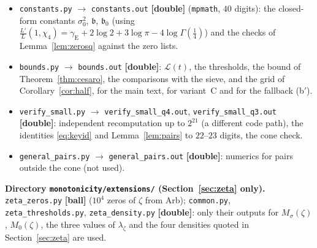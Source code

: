 \documentclass[11pt]{amsart}
\theoremstyle{definition}
\numberwithin{equation}{section}
\newcommand{\cL}{\mathcal L}          %
\newcommand{\vth}{\vartheta_{o}}      %
\begin{document}
\begin{itemize}
and $G\ge0.52$ on $[2^{13},10^{10}]$;
$(y-\vth(y))/\sqrt y\le1.98197$ resp.\ $1.99271$ for $y\ge1427$
against $c_1$; $\vth(y)-y\le-0.26\sqrt y$. The sign of
$\Theta_1(p)$ in this program is a floating-point decision and is
\emph{not} what the proof uses. What the proofs take from this
program is only Lemma~\ref{lem:theta}(a) on $(2^{22},10^{10}]$, and
not even that in variant~C.
\item \texttt{constants.py} $\to$ \texttt{constants.out}
\textbf{[double]} (\texttt{mpmath}, $40$ digits): the closed-form
constants $\sigma_0^2$, $\mathfrak b$, $\mathfrak b_0$ (using
$\frac{L'}{L}(1,\chi_4)=\gamma_{\mathrm E}+2\log2+3\log\pi
-4\log\Gamma(\tfrac14)$) and the checks of Lemma~\ref{lem:zerosq}
against the zero lists.
\item \texttt{bounds.py} $\to$ \texttt{bounds.out}
\textbf{[double]}: $\cL(t)$, the thresholds, the bound of
Theorem~\ref{thm:cesaro}, the comparisons with the sieve, and the
grid of Corollary~\ref{cor:half}, for the main text, for variant~C
and for the fallback (b$'$).
\item \texttt{verify\_small.py} $\to$
\texttt{verify\_small\_q4.out}, \texttt{verify\_small\_q3.out}
\textbf{[double]}: independent recomputation up to $2^{21}$ (a
different code path), the identities \eqref{eq:keyid} and
Lemma~\ref{lem:pairs} to $22$--$23$ digits, the cone check.
\item \texttt{general\_pairs.py} $\to$ \texttt{general\_pairs.out}
\textbf{[double]}: numerics for pairs outside the cone (not used).
\end{itemize}

\noindent\textbf{Directory \texttt{monotonicity/extensions/}
(Section~\ref{sec:zeta} only).} \texttt{zeta\_zeros.py}
\textbf{[ball]} ($10^4$ zeros of $\zeta$ from Arb);
\texttt{common.py}, \texttt{zeta\_thresholds.py},
\texttt{zeta\_density.py} \textbf{[double]}: only their outputs for
$M_\sigma(\zeta)$, $M_0(\zeta)$, the three values of $\lambda_\zeta$
and the four densities quoted in Section~\ref{sec:zeta} are used.
\end{document}
